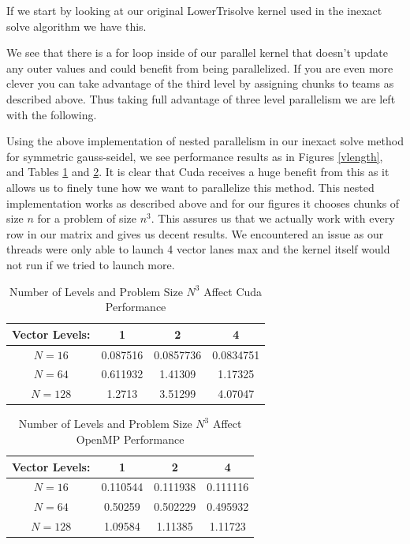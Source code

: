 \documentclass{ccr15}
\begin{document}
If we start by looking at our original LowerTrisolve kernel used in the inexact solve algorithm we have this.

\lstset{language=[Visual]C++}


We see that there is a for loop inside of our parallel kernel that doesn't update any outer values and
could benefit from being parallelized. If you are even more clever you can take advantage of the third level by
assigning chunks to teams as described above. Thus taking full advantage of three level parallelism we are left
with the following.

\lstset{language=[Visual]C++}


Using the above implementation of nested parallelism in our inexact solve method for symmetric gauss-seidel, we see performance results as in Figures \ref{vlength}, and Tables \ref{VLC} and \ref{VLO}.
 It is clear that Cuda receives a huge benefit
from this as it allows us to finely tune how we want to parallelize this method. This nested implementation works as described
above and for our figures it chooses chunks of size $n$ for a problem of size $n^3$. This assures us that we 
actually work with every row in our matrix and gives us decent results. We encountered an issue as our threads
were only able to launch 4 vector lanes max and the kernel itself would not run if we tried to launch more. 

\begin{table}[h]
\begin{center}
\begin{tabular}{|c||c|c|c|}
\hline
Vector Levels: & 1 & 2 & 4 \\
\hline \hline
$N=16$ & 0.087516 & 0.0857736 & 0.0834751 \\
\hline
$N=64$ & 0.611932 & 1.41309 & 1.17325 \\
\hline
$N=128$ & 1.2713 & 3.51299 & 4.07047 \\
\hline
\end{tabular}
\caption{Number of Levels and Problem Size $N^3$ Affect Cuda Performance}
\label{VLC}
\end{center}
\end{table}

\begin{table}[h]
\begin{center}
\begin{tabular}{|c||c|c|c|}
\hline
Vector Levels: & 1 & 2 & 4 \\
\hline \hline
$N=16$ & 0.110544 & 0.111938 & 0.111116 \\
\hline
$N=64$ & 0.50259 & 0.502229 & 0.495932 \\
\hline
$N=128$ & 1.09584 & 1.11385 & 1.11723\\
\hline
\end{tabular}
\caption{Number of Levels and Problem Size $N^3$ Affect OpenMP Performance}
\label{VLO}
\end{center}
\end{table}
\end{document}
